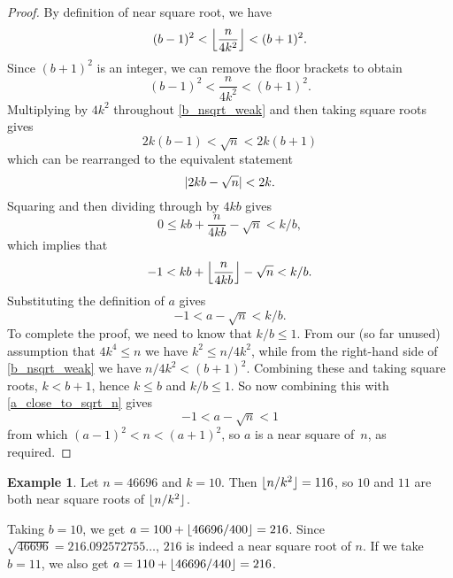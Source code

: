 \documentclass[a4paper]{article}
\DeclarePairedDelimiter\floor{\lfloor}{\rfloor}
\DeclarePairedDelimiter\abs{\lvert}{\rvert}
\theoremstyle{plain}
\theoremstyle{definition}
\newtheorem{example}[theorem]{Example}
\begin{document}
\begin{proof}
  By definition of near square root, we have
  \begin{equation}\label{b_nsqrt}
    (b - 1)^2 < \floor*{\frac{n}{4k^2}} < (b + 1)^2.
  \end{equation}
  Since $(b + 1)^2$ is an integer, we can remove the floor brackets to obtain
  \begin{equation}\label{b_nsqrt_weak}
    (b - 1)^2 < \frac{n}{4k^2} < (b + 1)^2.
  \end{equation}
  Multiplying by $4k^2$ throughout \eqref{b_nsqrt_weak} and then taking square
  roots gives
  \begin{equation}
    2k(b - 1) < \sqrt n < 2k(b + 1)
  \end{equation}
  which can be rearranged to the equivalent statement
  \begin{equation}
    \abs{2kb - \sqrt n} < 2k.
  \end{equation}
  Squaring and then dividing through by $4kb$ gives
  \begin{equation}
    0 \le kb + \frac{n}{4kb} - \sqrt n < k/b,
  \end{equation}
  which implies that
  \begin{equation}
    -1 < kb + \floor*{\frac{n}{4kb}} - \sqrt n < k/b.
  \end{equation}
  Substituting the definition of $a$ gives
  \begin{equation}\label{a_close_to_sqrt_n}
    -1 < a - \sqrt n < k/b.
  \end{equation}
  To complete the proof, we need to know that $k / b \le 1$. From our (so far
  unused) assumption that $4k^4 \le n$ we have $k^2 \le n / 4k^2$, while from
  the right-hand side of \eqref{b_nsqrt_weak} we have $n / 4k^2 < (b + 1)^2$.
  Combining these and taking square roots, $k < b + 1$, hence $k \le b $ and $k
  / b \le 1$. So now combining this with \eqref{a_close_to_sqrt_n} gives
  \begin{equation}
    -1 < a - \sqrt n < 1
  \end{equation}
  from which $(a - 1)^2 < n < (a + 1)^2$, so $a$ is a near square of~$n$, as
  required.
\end{proof}

\begin{example}
  Let $n = 46696$ and $k=10$. Then $\floor{n / k^2} = 116$, so $10$ and
  $11$ are both near square roots of $\floor{n / k^2}$.

  Taking $b = 10$, we get $a = 100 + \floor{46696 / 400} = 216$. Since
  $\sqrt{46696} = 216.092572755\dots$, $216$ is indeed a near square root of
  $n$. If we take $b = 11$, we also get $a = 110 + \floor{46696 / 440} = 216$.
\end{example}
\end{document}
